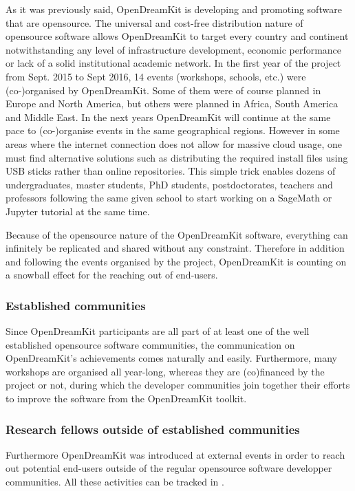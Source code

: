 \documentclass{deliverablereport}
\begin{document}
As it was previously said, OpenDreamKit is developing and promoting software that are opensource. The universal and cost-free distribution nature of opensource software allows OpenDreamKit to target every country and continent notwithstanding any level of infrastructure development, economic performance or lack of a solid institutional academic network.
In the first year of the project from Sept. 2015 to Sept 2016, 14 events (workshops, schools, etc.) were (co-)organised by OpenDreamKit. Some of them were of course planned in Europe and North America, but others were planned in Africa, South America and Middle East. In the next years OpenDreamKit will continue at the same pace to (co-)organise events in the same geographical regions.
However in some areas where the internet connection does not allow for massive cloud usage, one must find alternative solutions such as distributing the required install files using USB sticks  rather than online repositories. This simple trick enables dozens of undergraduates, master students, PhD students, postdoctorates, teachers and professors following the same given school to start working on a SageMath or Jupyter tutorial at the same time.

Because of the opensource nature of the OpenDreamKit software, everything can infinitely be replicated and shared without any constraint. Therefore in addition and following the events organised by the project, OpenDreamKit is counting on a snowball effect for the reaching out of end-users.



\subsubsection{Established communities}

Since OpenDreamKit participants are all part of at least one of the well established opensource software communities, the communication on OpenDreamKit's achievements comes naturally and easily. Furthermore, many workshops are organised all year-long, whereas they are (co)financed by the project or not, during which the developer communities join together their efforts to improve the software from the OpenDreamKit toolkit. 

\subsubsection{Research fellows outside of established communities}

Furthermore OpenDreamKit was introduced at external events in order to reach out potential end-users outside of the regular opensource software developper communities.
All these activities can be tracked in . 
\end{document}
